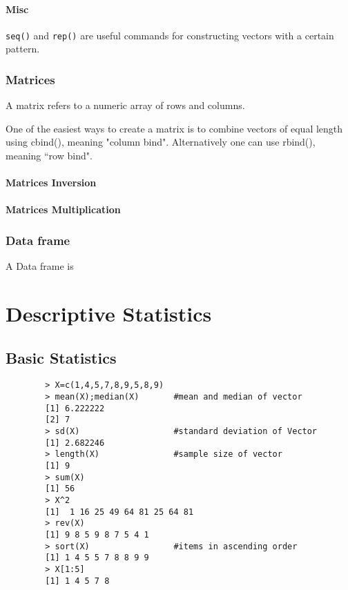 \documentclass[a4paper,12pt]{article}
\begin{document}
	\subsubsection{Misc}
	\texttt{seq()} and \texttt{rep()} are useful commands for constructing vectors with a certain pattern.
	
	
	\subsection{Matrices}
	A matrix refers to a numeric array of rows and columns.
	
	One of the easiest ways to create a matrix is to combine vectors of equal
	length using cbind(), meaning "column bind". Alternatively one can use rbind(), meaning ``row bind".
	
	
	\subsubsection{Matrices Inversion}
	\subsubsection{Matrices Multiplication}
	
	
	\subsection{Data frame}
	A Data frame is
	\newpage
	
	
	\chapter{Descriptive Statistics}
	
	\section{Basic Statistics}
	
	\large
	\begin{framed}
		\begin{verbatim}
		> X=c(1,4,5,7,8,9,5,8,9)
		> mean(X);median(X)       #mean and median of vector
		[1] 6.222222
		[2] 7
		> sd(X)                   #standard deviation of Vector
		[1] 2.682246
		> length(X)               #sample size of vector
		[1] 9
		> sum(X)
		[1] 56
		> X^2
		[1]  1 16 25 49 64 81 25 64 81
		> rev(X)
		[1] 9 8 5 9 8 7 5 4 1
		> sort(X)                 #items in ascending order
		[1] 1 4 5 5 7 8 8 9 9
		> X[1:5]
		[1] 1 4 5 7 8
		\end{verbatim}
	\end{framed}
	\large
	
\end{document}
